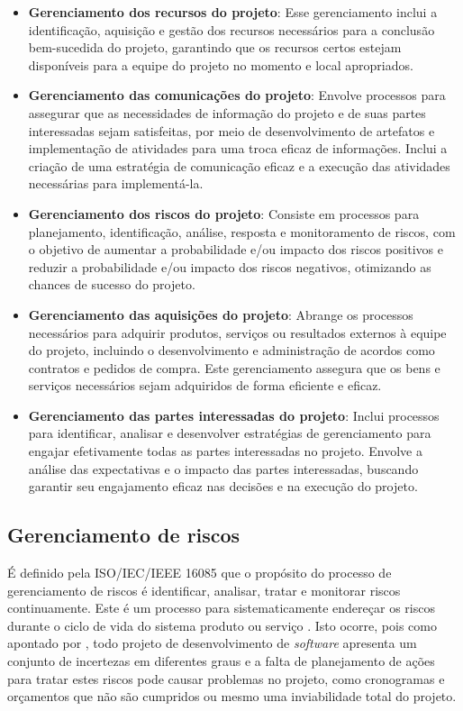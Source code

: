 \documentclass[
	12pt,
	openright,
	twoside,
	a4paper,
	english,
	brazil
	]{abntex2}
\begin{document}
\begin{itemize}
  \item \textbf{Gerenciamento dos recursos do projeto}: Esse gerenciamento inclui a identificação, aquisição e gestão dos recursos necessários para a conclusão bem-sucedida do projeto, garantindo que os recursos certos estejam disponíveis para a equipe do projeto no momento e local apropriados.
  \item \textbf{Gerenciamento das comunicações do projeto}: Envolve processos para assegurar que as necessidades de informação do projeto e de suas partes interessadas sejam satisfeitas, por meio de desenvolvimento de artefatos e implementação de atividades para uma troca eficaz de informações. Inclui a criação de uma estratégia de comunicação eficaz e a execução das atividades necessárias para implementá-la.
  \item \textbf{Gerenciamento dos riscos do projeto}: Consiste em processos para planejamento, identificação, análise, resposta e monitoramento de riscos, com o objetivo de aumentar a probabilidade e/ou impacto dos riscos positivos e reduzir a probabilidade e/ou impacto dos riscos negativos, otimizando as chances de sucesso do projeto.
  \item \textbf{Gerenciamento das aquisições do projeto}: Abrange os processos necessários para adquirir produtos, serviços ou resultados externos à equipe do projeto, incluindo o desenvolvimento e administração de acordos como contratos e pedidos de compra. Este gerenciamento assegura que os bens e serviços necessários sejam adquiridos de forma eficiente e eficaz.
  \item \textbf{Gerenciamento das partes interessadas do projeto}: Inclui processos para identificar, analisar e desenvolver estratégias de gerenciamento para engajar efetivamente todas as partes interessadas no projeto. Envolve a análise das expectativas e o impacto das partes interessadas, buscando garantir seu engajamento eficaz nas decisões e na execução do projeto.
\end{itemize}


\subsection{Gerenciamento de riscos}

É definido pela ISO/IEC/IEEE 16085 que o propósito do processo de gerenciamento de riscos é identificar, analisar, tratar e monitorar riscos continuamente. Este é um processo para sistematicamente endereçar os riscos durante o ciclo de vida do sistema produto ou serviço \cite{iso16085}. Isto ocorre, pois como apontado por , todo projeto de desenvolvimento de \textit{software} apresenta um conjunto de incertezas em diferentes graus e a falta de planejamento de ações para tratar estes riscos pode causar problemas no projeto, como cronogramas e orçamentos que não são cumpridos ou mesmo uma inviabilidade total do projeto.
\end{document}
